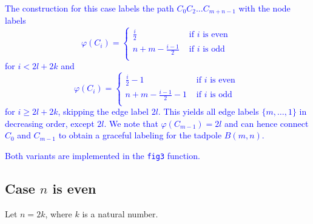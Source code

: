 \documentclass[fleqn,svgnames,screen,acmsmall]{ml2rcn}
\newcommand{\additionalcomment}[1]{\textcolor{blue}{#1}}
\begin{document}
  \additionalcomment{
    The construction for this case labels the path $C_0C_2\ldots C_{m+n-1}$ with the node labels 
    \[ \varphi(C_i) = 
    \begin{cases}
      \frac{i}{2} & \text{ if $i$ is even } \\
      n+m - \frac{i-1}{2} & \text{ if $i$ is odd } \\
    \end{cases} 
    \]
    for $i < 2l+2k$ and 
    \[ \varphi(C_i) = 
    \begin{cases}
      \frac{i}{2} - 1 & \text{ if $i$ is even } \\
      n+m - \frac{i-1}{2} - 1 & \text{ if $i$ is odd } \\
    \end{cases} 
    \]
    for $i \geq 2l+2k$, skipping the edge label $2l$. This yields all edge labels $\{m, \ldots, 1\}$ in decreasing order, except $2l$. We note that $\varphi(C_{m-1}) = 2l$ and can hence connect $C_0$ and $C_{m-1}$ to obtain a graceful labeling for the tadpole $B(m, n)$.
    }

  \additionalcomment{
    Both variants are implemented in the \texttt{fig3} function.
  }

\vspace{0.5\baselineskip}


\subsection{Case \(n\) is even} %
\label{sec3:even}
  Let \(n = 2k\), where \(k\) is a natural number.
\end{document}
